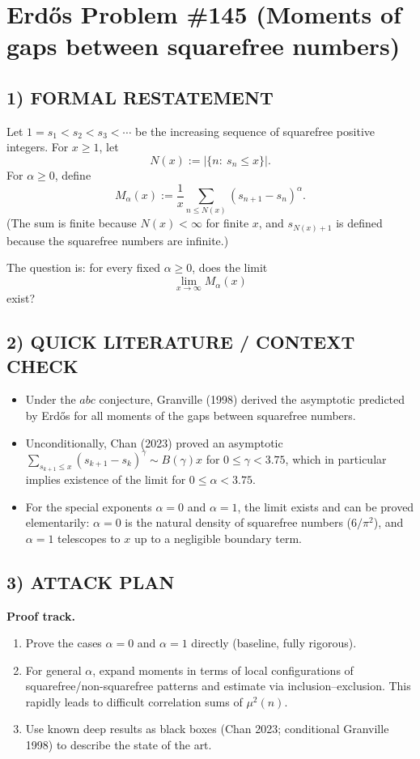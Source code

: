 \section*{Erd\H{o}s Problem \#145 (Moments of gaps between squarefree numbers)}

\subsection*{1) FORMAL RESTATEMENT}
Let $1=s_1<s_2<s_3<\cdots$ be the increasing sequence of squarefree positive integers.
For $x\ge 1$, let
\[
N(x):=|\{n:\ s_n\le x\}|.
\]
For $\alpha\ge 0$, define
\[
M_{\alpha}(x):=\frac{1}{x}\sum_{n\le N(x)}(s_{n+1}-s_n)^{\alpha}.
\]
(The sum is finite because $N(x)<\infty$ for finite $x$, and $s_{N(x)+1}$ is defined because the squarefree numbers are infinite.)

The question is: for every fixed $\alpha\ge 0$, does the limit
\[
\lim_{x\to\infty} M_{\alpha}(x)
\]
exist?

\subsection*{2) QUICK LITERATURE / CONTEXT CHECK}
\begin{itemize}
\item Under the $abc$ conjecture, Granville (1998) derived the asymptotic predicted by Erd\H{o}s for all moments of the gaps between squarefree numbers.
\item Unconditionally, Chan (2023) proved an asymptotic $\sum_{s_{k+1}\le x}(s_{k+1}-s_k)^{\gamma}\sim B(\gamma)x$ for $0\le\gamma<3.75$, which in particular implies existence of the limit for $0\le\alpha<3.75$.
\item For the special exponents $\alpha=0$ and $\alpha=1$, the limit exists and can be proved elementarily: $\alpha=0$ is the natural density of squarefree numbers ($6/\pi^2$), and $\alpha=1$ telescopes to $x$ up to a negligible boundary term.
\end{itemize}

\subsection*{3) ATTACK PLAN}
\textbf{Proof track.}
\begin{enumerate}
\item Prove the cases $\alpha=0$ and $\alpha=1$ directly (baseline, fully rigorous).
\item For general $\alpha$, expand moments in terms of local configurations of squarefree/non-squarefree patterns and estimate via inclusion--exclusion. This rapidly leads to difficult correlation sums of $\mu^2(n)$.
\item Use known deep results as black boxes (Chan 2023; conditional Granville 1998) to describe the state of the art.
\end{enumerate}

